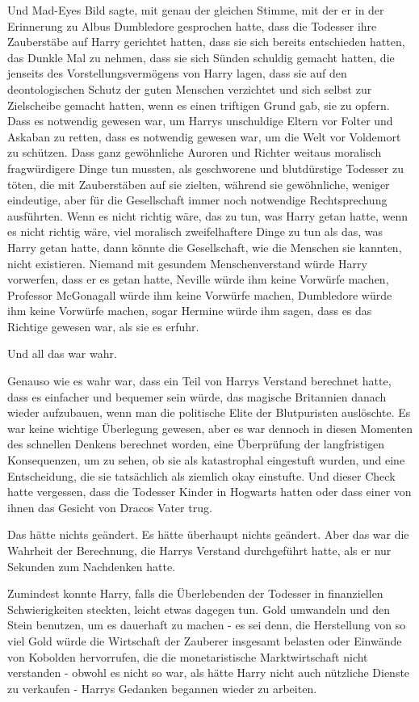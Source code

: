 Und Mad-Eyes Bild sagte, mit genau der gleichen Stimme, mit der er in der
Erinnerung zu Albus Dumbledore gesprochen hatte, dass die Todesser ihre
Zauberstäbe auf Harry gerichtet hatten, dass sie sich bereits entschieden
hatten, das Dunkle Mal zu nehmen, dass sie sich Sünden schuldig gemacht hatten,
die jenseits des Vorstellungsvermögens von Harry lagen, dass sie auf den
deontologischen Schutz der guten Menschen verzichtet und sich selbst zur
Zielscheibe gemacht hatten, wenn es einen triftigen Grund gab, sie zu opfern.
Dass es notwendig gewesen war, um Harrys unschuldige Eltern vor Folter und
Askaban zu retten, dass es notwendig gewesen war, um die Welt vor Voldemort zu
schützen. Dass ganz gewöhnliche Auroren und Richter weitaus moralisch
fragwürdigere Dinge tun mussten, als geschworene und blutdürstige Todesser zu
töten, die mit Zauberstäben auf sie zielten, während sie gewöhnliche, weniger
eindeutige, aber für die Gesellschaft immer noch notwendige Rechtsprechung
ausführten. Wenn es nicht richtig wäre, das zu tun, was Harry getan hatte, wenn
es nicht richtig wäre, viel moralisch zweifelhaftere Dinge zu tun als das, was
Harry getan hatte, dann könnte die Gesellschaft, wie die Menschen sie kannten,
nicht existieren. Niemand mit gesundem Menschenverstand würde Harry vorwerfen,
dass er es getan hatte, Neville würde ihm keine Vorwürfe machen, Professor
McGonagall würde ihm keine Vorwürfe machen, Dumbledore würde ihm keine Vorwürfe
machen, sogar Hermine würde ihm sagen, dass es das Richtige gewesen war, als sie
es erfuhr.

Und all das war wahr.

Genauso wie es wahr war, dass ein Teil von Harrys Verstand berechnet hatte, dass
es einfacher und bequemer sein würde, das magische Britannien danach wieder
aufzubauen, wenn man die politische Elite der Blutpuristen auslöschte. Es war
keine wichtige Überlegung gewesen, aber es war dennoch in diesen Momenten des
schnellen Denkens berechnet worden, eine Überprüfung der langfristigen
Konsequenzen, um zu sehen, ob sie als katastrophal eingestuft wurden, und eine
Entscheidung, die sie tatsächlich als ziemlich okay einstufte. Und dieser Check
hatte vergessen, dass die Todesser Kinder in Hogwarts hatten oder dass einer von
ihnen das Gesicht von Dracos Vater trug.

Das hätte nichts geändert. Es hätte überhaupt nichts geändert. Aber das war die
Wahrheit der Berechnung, die Harrys Verstand durchgeführt hatte, als er nur
Sekunden zum Nachdenken hatte.

Zumindest konnte Harry, falls die Überlebenden der Todesser in finanziellen
Schwierigkeiten steckten, leicht etwas dagegen tun. Gold umwandeln und den Stein
benutzen, um es dauerhaft zu machen - es sei denn, die Herstellung von so viel
Gold würde die Wirtschaft der Zauberer insgesamt belasten oder Einwände von
Kobolden hervorrufen, die die monetaristische Marktwirtschaft nicht verstanden -
obwohl es nicht so war, als hätte Harry nicht auch nützliche Dienste zu
verkaufen - Harrys Gedanken begannen wieder zu arbeiten.

